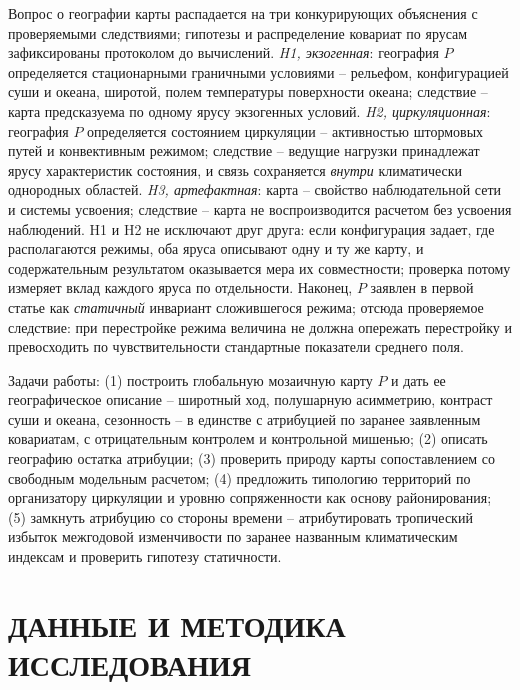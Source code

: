 \documentclass[12pt,a4paper]{article}
\begin{document}
Вопрос о географии карты распадается на три конкурирующих объяснения с проверяемыми следствиями; гипотезы и распределение ковариат по ярусам зафиксированы протоколом до вычислений. \emph{H1, экзогенная}: география $P$ определяется стационарными граничными условиями -- рельефом, конфигурацией суши и океана, широтой, полем температуры поверхности океана; следствие -- карта предсказуема по одному ярусу экзогенных условий. \emph{H2, циркуляционная}: география $P$ определяется состоянием циркуляции -- активностью штормовых путей и конвективным режимом; следствие -- ведущие нагрузки принадлежат ярусу характеристик состояния, и связь сохраняется \emph{внутри} климатически однородных областей. \emph{H3, артефактная}: карта -- свойство наблюдательной сети и системы усвоения; следствие -- карта не воспроизводится расчетом без усвоения наблюдений. H1 и H2 не исключают друг друга: если конфигурация задает, где располагаются режимы, оба яруса описывают одну и ту же карту, и содержательным результатом оказывается мера их совместности; проверка потому измеряет вклад каждого яруса по отдельности. Наконец, $P$ заявлен в первой статье как \emph{статичный} инвариант сложившегося режима; отсюда проверяемое следствие: при перестройке режима величина не должна опережать перестройку и превосходить по чувствительности стандартные показатели среднего поля.

Задачи работы: (1) построить глобальную мозаичную карту $P$ и дать ее географическое описание -- широтный ход, полушарную асимметрию, контраст суши и океана, сезонность -- в единстве с атрибуцией по заранее заявленным ковариатам, с отрицательным контролем и контрольной мишенью; (2) описать географию остатка атрибуции; (3) проверить природу карты сопоставлением со свободным модельным расчетом; (4) предложить типологию территорий по организатору циркуляции и уровню сопряженности как основу районирования; (5) замкнуть атрибуцию со стороны времени -- атрибутировать тропический избыток межгодовой изменчивости по заранее названным климатическим индексам и проверить гипотезу статичности.

\section{ДАННЫЕ И МЕТОДИКА ИССЛЕДОВАНИЯ}
\end{document}

